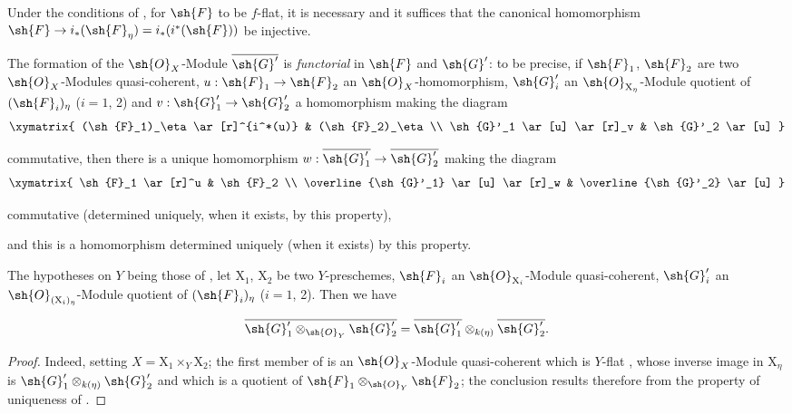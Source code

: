\begin{corollary}[2.8.2]
\label{IV.2.8.2}
Under the conditions of , for $\sh{F}$ to be $f$-flat, it is necessary and
it suffices that the canonical homomorphism $\sh{F}\to i_*(\sh{F}_\eta)=i_*(i^*(\sh{F}))$ be injective.
\end{corollary}

\begin{env}[2.8.3]
\label{IV.2.8.3}
The formation of the $\sh{O}_X$-Module $\overline{\sh{G}'}$ is \emph{functorial} in $\sh{F}$ and $\sh{G}'$: to be precise,
if $\sh{F}_1$, $\sh{F}_2$ are two $\sh{O}_X$-Modules quasi-coherent, $u:\sh{F}_1\to\sh{F}_2$ an $\sh{O}_X$-homomorphism,
$\sh{G}'_i$ an $\sh{O}_{\mathrm{X}_\eta}$-Module quotient of $(\sh{F}_i)_\eta$ ($i=1$, 2) and $v:\sh{G}'_1\to\sh{G}'_2$ a homomorphism
making the diagram
\[
\xymatrix{
  (\sh{F}_1)_\eta \ar[r]^{i^*(u)} & (\sh{F}_2)_\eta \\
  \sh{G}'_1 \ar[u] \ar[r]_v & \sh{G}'_2 \ar[u]
}
\]

commutative, then there is a unique homomorphism $w:\overline{\sh{G}'_1}\to\overline{\sh{G}'_2}$ making the diagram
\[
\xymatrix{
  \sh{F}_1 \ar[r]^u & \sh{F}_2 \\
  \overline{\sh{G}'_1} \ar[u] \ar[r]_w & \overline{\sh{G}'_2} \ar[u]
}
\]

commutative (determined uniquely, when it exists, by this property),


and this is a homomorphism determined uniquely (when it exists) by this property.
\end{env}

\begin{proposition}[2.8.4]
\label{IV.2.8.4}
The hypotheses on $Y$ being those of , let $\mathrm{X}_1$, $\mathrm{X}_2$ be
two $Y$-preschemes, $\sh{F}_i$ an $\sh{O}_{\mathrm{X}_i}$-Module quasi-coherent, $\sh{G}'_i$ an $\sh{O}_{(\mathrm{X}_i)_\eta}$-Module quotient of $(\sh{F}_i)_\eta$
($i=1$, 2). Then we have
\end{proposition}

\begin{env}[2.8.4.1]
\label{IV.2.8.4.1}
\[
  \overline{\sh{G}'_1\otimes_{\sh{O}_Y}\sh{G}'_2} = \overline{\sh{G}'_1}\otimes_{k(\eta)}\overline{\sh{G}'_2}.
\]
\end{env}

\begin{proof}
Indeed, setting $X=\mathrm{X}_1\times_Y\mathrm{X}_2$; the first member of  is an $\sh{O}_X$-Module
quasi-coherent which is $Y$-flat , whose inverse image in $\mathrm{X}_\eta$ is $\sh{G}'_1\otimes_{k(\eta)}\sh{G}'_2$
 and which is a quotient of $\sh{F}_1\otimes_{\sh{O}_Y}\sh{F}_2$; the conclusion results therefore from the property
of uniqueness of .
\end{proof}

